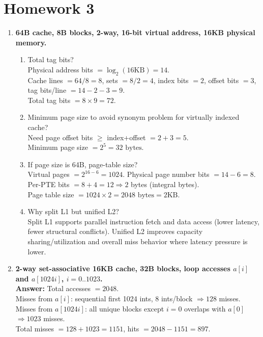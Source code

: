 \documentclass[11pt]{article}
\begin{document}
\section*{Homework 3}
\begin{enumerate}
\item \textbf{64B cache, 8B blocks, 2-way, 16-bit virtual address, 16KB physical memory.}
\begin{enumerate}[label=(\alph*)]
\item Total tag bits?\\
Physical address bits $=\log_2(16\text{KB})=14$.\\
Cache lines $=64/8=8$, sets $=8/2=4$, index bits $=2$, offset bits $=3$, tag bits/line $=14-2-3=9$.\\
Total tag bits $=8\times 9=\boxed{72}$.

\item Minimum page size to avoid synonym problem for virtually indexed cache?\\
Need page offset bits $\ge$ index+offset $=2+3=5$.\\
Minimum page size $=2^5=\boxed{32\text{ bytes}}$.

\item If page size is 64B, page-table size?\\
Virtual pages $=2^{16-6}=1024$. Physical page number bits $=14-6=8$.\\
Per-PTE bits $=8+4=12\Rightarrow 2$ bytes (integral bytes).\\
Page table size $=1024\times2=\boxed{2048\text{ bytes}=2\text{KB}}$.

\item Why split L1 but unified L2?\\
Split L1 supports parallel instruction fetch and data access (lower latency, fewer structural conflicts). Unified L2 improves capacity sharing/utilization and overall miss behavior where latency pressure is lower.
\end{enumerate}

\item \textbf{2-way set-associative 16KB cache, 32B blocks, loop accesses $a[i]$ and $a[1024i]$, $i=0..1023$.}\\
\textbf{Answer:} Total accesses $=2048$.\\
Misses from $a[i]$: sequential first 1024 ints, 8 ints/block $\Rightarrow 128$ misses.\\
Misses from $a[1024i]$: all unique blocks except $i=0$ overlaps with $a[0]$ $\Rightarrow 1023$ misses.\\
Total misses $=128+1023=\boxed{1151}$, hits $=2048-1151=\boxed{897}$.


\end{enumerate}
\end{document}
